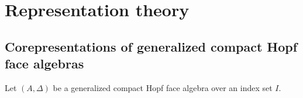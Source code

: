 \section{Representation theory}

\subsection{Corepresentations of generalized compact Hopf face
  algebras}

Let $(A,\Delta)$ be a generalized compact Hopf face algebra over an
index set $I$. %
